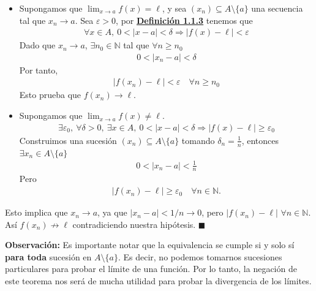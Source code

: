 \documentclass[12pt]{book}
\renewenvironment{proof}[1][\textit{Demostración}]{%
  \par\noindent{\bfseries #1.}\enspace}{\hfill$\blacksquare$\par}
\begin{document}
\begin{proof}
   \begin{itemize}
       \item[$(\Longrightarrow)$]

        Supongamos que $\displaystyle \lim_{x \to a} f(x)= \ell$, y sea $(x_n) \subseteq A\setminus \{a\}$ una secuencia tal que  $x_n \to a$. Sea $\varepsilon>0$, por \hyperref[th:def:limite]{\textbf{Definición 1.1.3}} tenemos que 
        \begin{align*}
            \forall x \in A, \ 0<|x-a| < \delta \Longrightarrow |f(x)-\ell|< \varepsilon
        \end{align*}
        Dado que $x_n \to a$, $\exists n_0 \in \mathbb{N}$ tal que $\forall n \geq n_0$
        \begin{align*}
           0< |x_n-a|<\delta
        \end{align*}
        Por tanto,
        \begin{align*}
            |f(x_n)-\ell| < \varepsilon \quad \forall n \geq n_0
        \end{align*}
        Esto prueba que $f(x_n) \to \ell$.

        \item[$(\Longleftarrow)$] Supongamos que $\displaystyle \lim_{x \to a }f(x)\neq \ell$. 
        \begin{align*}
            \exists \varepsilon_0, \ \forall \delta>0, \  \exists x \in A,  \ 0<|x-a|<\delta \Longrightarrow| f(x)-\ell | \geq \varepsilon_0
        \end{align*}
      Construimos una sucesión $(x_n) \subseteq A \setminus \{a\}$ tomando $\delta_n = \frac{1}{n}$, entonces $\exists x_n \in A \setminus \{a\}$  
        \begin{align*}
            0<|x_n-a|< \frac{1}{n}  
        \end{align*}
        Pero 
        \begin{align*}
            |f(x_n)-\ell| \geq \varepsilon_0 \quad \forall n \in \mathbb{N}.
        \end{align*}
   \end{itemize}
   Esto implica que $x_n \to a$, ya que $|x_n-a|<1/n \to 0$, pero $|f(x_n)-\ell| $ $\forall n \in \mathbb{N}$. Así $f(x_n) \not\to \ell$ contradiciendo nuestra hipótesis.
\end{proof}
\textbf{Observación:} Es importante notar que la equivalencia se cumple si y solo sí \textbf{para toda} sucesión en $A\setminus \{a\}$. Es decir, no podemos tomarnos sucesiones particulares para probar el límite de una función. Por lo tanto, la negación de este teorema nos será de mucha utilidad para probar la divergencia de los límites.
\end{document}
